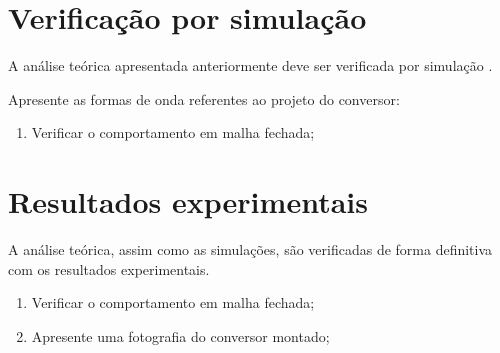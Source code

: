 %

%



\section{Verificação por simulação}

A análise teórica apresentada anteriormente deve ser verificada por simulação \cite{noauthor_psim_nodate}.
									
 Apresente as formas de onda referentes ao projeto do conversor:
 
\begin{enumerate}
	\item Verificar o comportamento em malha fechada;
\end{enumerate}


\section{Resultados experimentais}


A análise teórica, assim como as simulações, são verificadas de forma definitiva com os resultados experimentais.
\begin{enumerate}									
	\item Verificar o comportamento em malha fechada;
	\item  Apresente uma fotografia do conversor montado;
\end{enumerate}

